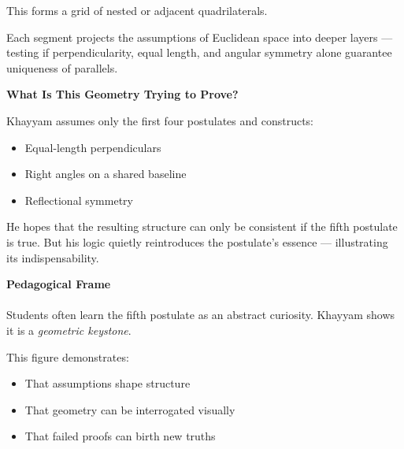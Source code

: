\documentclass[9pt]{article}
\begin{document}
This forms a grid of nested or adjacent quadrilaterals.

Each segment projects the assumptions of Euclidean space into deeper layers — testing if perpendicularity, equal length, and angular symmetry alone guarantee uniqueness of parallels.

\vspace{1em}

\textbf{What Is This Geometry Trying to Prove?}

Khayyam assumes only the first four postulates and constructs:

\begin{itemize}
    \item Equal-length perpendiculars
    \item Right angles on a shared baseline
    \item Reflectional symmetry
\end{itemize}

He hopes that the resulting structure can only be consistent if the fifth postulate is true. But his logic quietly reintroduces the postulate’s essence — illustrating its indispensability.

\vspace{1em}

\textbf{Pedagogical Frame} \\\\
Students often learn the fifth postulate as an abstract curiosity. Khayyam shows it is a \textit{geometric keystone}.

This figure demonstrates:
\begin{itemize}
    \item That assumptions shape structure
    \item That geometry can be interrogated visually
    \item That failed proofs can birth new truths
\end{itemize}

\vspace{1em}

\begin{center}
\end{center}
\end{document}
